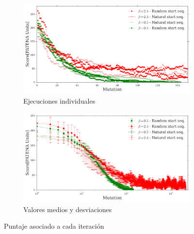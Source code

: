 % 
% 


\begin{figure}[htbp]
\advance\leftskip-1.5cm
  \begin{subfigure}[b]{\textwidth}
 \includegraphics[width=1.1\textwidth]{img/resultados/iterationVsScore-individual.png}
    \caption{Ejecuciones individuales}
    \label{fig:scoreVsiter-a}
  \end{subfigure}
  \begin{subfigure}[b]{\textwidth}
     \includegraphics[width=1.1\textwidth]{img/resultados/iterationVsScore-mean.png}
    \caption{Valores medios y desviaciones}
  \label{fig:scoreVsiter-b}
  \end{subfigure}
  \caption{Puntaje asociado a cada iteración}
  \label{fig:scoreVsiter}
\end{figure}


